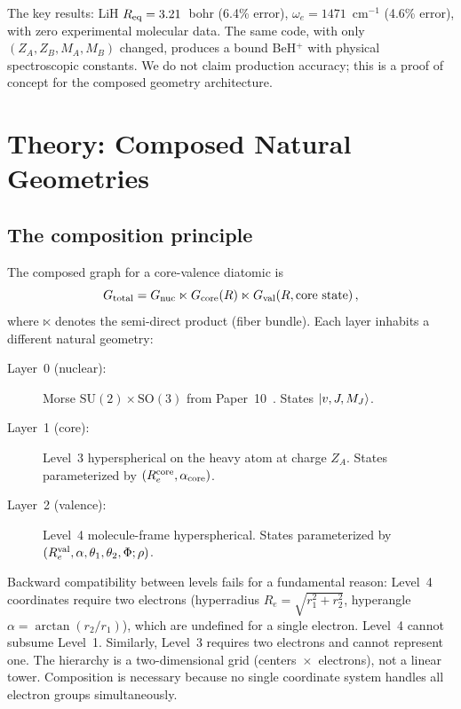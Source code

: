 \documentclass[aps,pra,twocolumn,superscriptaddress,longbibliography,floatfix]{revtex4-2}
\begin{document}
The key results: LiH $R_{\rm eq} = 3.21$~bohr (6.4\% error),
$\omega_e = 1471$~cm$^{-1}$ (4.6\% error), with zero experimental
molecular data.  The same code, with only $(Z_A, Z_B, M_A, M_B)$
changed, produces a bound BeH$^+$ with physical spectroscopic
constants.  We do not claim production accuracy; this is a proof of
concept for the composed geometry architecture.


\section{Theory: Composed Natural Geometries}
\label{sec:theory}

\subsection{The composition principle}
\label{sec:composition}

The composed graph for a core-valence diatomic is
\begin{equation}
  G_{\rm total} = G_{\rm nuc} \ltimes G_{\rm core}(R)
    \ltimes G_{\rm val}(R, \text{core state})\,,
  \label{eq:Gtotal}
\end{equation}
where $\ltimes$ denotes the semi-direct product (fiber bundle).
Each layer inhabits a different natural geometry:

\begin{description}
\item[Layer~0 (nuclear):]
  Morse $\text{SU}(2) \times \text{SO}(3)$ from Paper~10~\cite{paper10}.
  States $\ket{v, J, M_J}$.

\item[Layer~1 (core):]
  Level~3 hyperspherical on the heavy atom at charge $Z_A$.
  States parameterized by $(R_e^{\rm core}, \alpha_{\rm core})$.

\item[Layer~2 (valence):]
  Level~4 molecule-frame hyperspherical.
  States parameterized by
  $(R_e^{\rm val}, \alpha, \theta_1, \theta_2, \Phi; \rho)$.
\end{description}

Backward compatibility between levels fails for a fundamental reason:
Level~4 coordinates require two electrons (hyperradius
$R_e = \sqrt{r_1^2 + r_2^2}$, hyperangle $\alpha = \arctan(r_2/r_1)$),
which are undefined for a single electron.  Level~4 cannot subsume
Level~1.  Similarly, Level~3 requires two electrons and cannot
represent one.  The hierarchy is a two-dimensional grid
(centers~$\times$~electrons), not a linear tower.  Composition is
necessary because no single coordinate system handles all electron
groups simultaneously.
\end{document}
